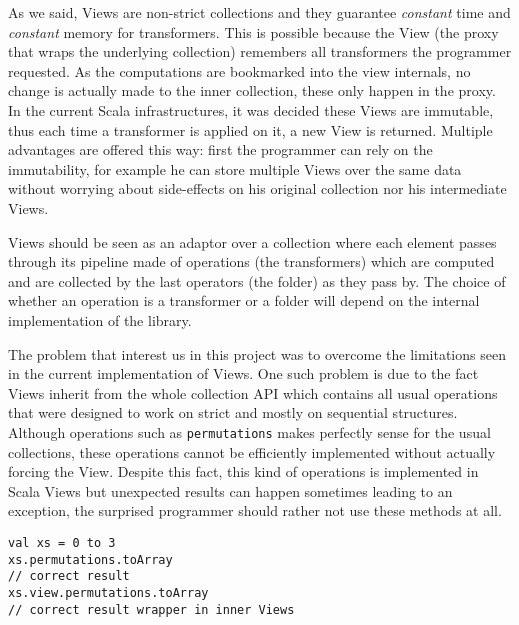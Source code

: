 \documentclass[a4paper,12pt,twocolumn]{article}
\begin{document}
As we said, Views are non-strict collections and they guarantee {\it constant} time and {\it constant} memory for transformers.
This is possible because the View (the proxy that wraps the underlying collection) remembers all transformers the programmer requested.
As the computations are bookmarked into the view internals, no change is actually made to the inner collection, these only happen in the proxy.
In the current Scala infrastructures, it was decided these Views are immutable, thus each time a transformer is applied on it, a new View is returned.
Multiple advantages are offered this way: first the programmer can rely on the immutability, for example he can store multiple Views over the same data without worrying about side-effects on his original collection nor his intermediate Views.

Views should be seen as an adaptor over a collection where each element passes through its pipeline made of operations (the transformers) which are computed and are collected by the last operators (the folder) as they pass by.
The choice of whether an operation is a transformer or a folder will depend on the internal implementation of the library.

The problem that interest us in this project was to overcome the limitations seen in the current implementation of Views.
One such problem is due to the fact Views inherit from the whole collection API which contains all usual operations that were designed to work on strict and mostly on sequential structures.
Although operations such as \verb|permutations| makes perfectly sense for the usual collections, these operations cannot be efficiently implemented without actually forcing the View.%
Despite this fact, this kind of operations is implemented in Scala Views but unexpected results can happen sometimes leading to an exception, the surprised programmer should rather not use these methods at all. %

\begin{lstlisting}
val xs = 0 to 3
xs.permutations.toArray
// correct result
xs.view.permutations.toArray
// correct result wrapper in inner Views
\end{lstlisting}
\end{document}
